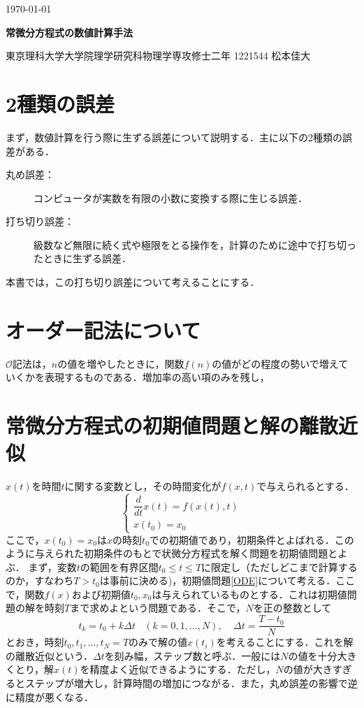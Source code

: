 \documentclass[12pt]{jsarticle}\usepackage{ifthen}\newboolean{enlarge}\setboolean{enlarge}{false}
\begin{document}
\begin{flushright}
\footnotesize
\today
\end{flushright}
\noindent
{\bf
\Large 常微分方程式の数値計算手法}
\begin{flushright}
東京理科大学大学院理学研究科物理学専攻修士二年
1221544 松本佳大
\end{flushright}


\section{2種類の誤差}
まず，数値計算を行う際に生ずる誤差について説明する．主に以下の2種類の誤差がある．
\begin{kotak}
	\begin{description}
   \item[丸め誤差：]コンピュータが実数を有限の小数に変換する際に生じる誤差．
   \item[打ち切り誤差：]級数など無限に続く式や極限をとる操作を，計算のために途中で打ち切ったときに生ずる誤差．
\end{description}
\end{kotak}
本書では，この打ち切り誤差について考えることにする．

\section{オーダー記法について}
$\mathcal{O}$記法は，$n$の値を増やしたときに，関数$f(n)$の値がどの程度の勢いで増えていくかを表現するものである．増加率の高い項のみを残し，

\section{常微分方程式の初期値問題と解の離散近似}
$x(t)$を時間$t$に関する変数とし，その時間変化が$f(x,t)$で与えられるとする．
\begin{equation}\label{ODE}
	\left\{
\begin{array}{l}
\dfrac{d}{dt}x(t)=f(x(t),t) \\[10pt]
x(t_0)=x_0
\end{array}
\right.
\end{equation}
ここで，$x(t_0)=x_0$は$x$の時刻$t_0$での初期値であり，初期条件とよばれる．このように与えられた初期条件のもとで状微分方程式を解く問題を初期値問題とよぶ．
まず，変数$t$の範囲を有界区間$t_0\leq t\leq T$に限定し（ただしどこまで計算するのか，すなわち$T>t_0$は事前に決める)，初期値問題\eqref{ODE}について考える．ここで，関数$f(x)$および初期値$t_0,x_0$は与えられているものとする．これは初期値問題の解を時刻$T$まで求めよという問題である．そこで，$N$を正の整数として
\begin{equation}
	t_k=t_0 + k \Delta t\ \ \ \ (k=0,1,\ldots,N),\ \ \ \ \ \Delta t=\frac{T-t_0}{N}
\end{equation}
とおき，時刻$t_0,t_1,\ldots,t_N=T$のみで解の値$x(t_i)$を考えることにする．これを解の離散近似という．$\Delta t$を刻み幅，ステップ数と呼ぶ．一般には$N$の値を十分大きくとり，解$x(t)$を精度よく近似できるようにする．ただし，$N$の値が大きすぎるとステップが増大し，計算時間の増加につながる．また，丸め誤差の影響で逆に精度が悪くなる．
%
\end{document}
